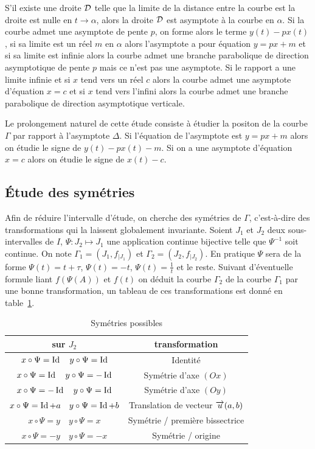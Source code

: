 S'il existe une droite $\mathcal{D}$ telle que la limite de la distance entre la courbe est la droite est nulle en $t \to \alpha$, alors la droite $\mathcal{D}$ est asymptote à la courbe en $\alpha$. Si la courbe admet une asymptote de pente $p$, on forme alors le terme $y(t)-px(t)$, si sa limite est un réel $m$ en $\alpha$ alors l'asymptote a pour équation $y=px+m$ et si sa limite est infinie alors la courbe admet une branche parabolique de direction asymptotique de pente $p$ mais ce n'est pas une asymptote. Si le rapport a une limite infinie et si $x$ tend vers un réel $c$ alors la courbe admet une asymptote d'équation $x=c$ et si $x$ tend vers l'infini alors la courbe admet une branche parabolique de direction asymptotique verticale.

Le prolongement naturel de cette étude consiste à étudier la positon de la courbe $\Gamma$ par rapport à l'asymptote $\Delta$. Si l'équation de l'asymptote est $y=px+m$ alors on étudie le signe de $y(t)-px(t)-m$. Si on a une asymptote d'équation $x=c$ alors on étudie le signe de $x(t)-c$.

\subsection{Étude des symétries}
Afin de réduire l'intervalle d'étude, on cherche des symétries de $\Gamma$, c'est-à-dire des transformations qui la laissent globalement invariante. Soient $J_1$ et $J_2$ deux sous-intervalles de $I$, $\Psi:J_2 \longmapsto J_1$ une application continue bijective telle que $\Psi^{-1}$ soit continue. On note $\Gamma_1=(J_1,f_{|J_1})$ et $\Gamma_2=(J_2,f_{|J_2})$. En pratique $\Psi$ sera de la forme $\Psi(t)=t+\tau$, $\Psi(t)=-t$, $\Psi(t)=\frac{1}{t}$ et le reste. Suivant d'éventuelle formule liant $f(\Psi(A))$ et $f(t)$ on déduit la courbe $\Gamma_2$ de la courbe $\Gamma_1$ par une bonne transformation, un tableau de ces transformations est donné en table~\ref{tab:sym}.

\begin{table}
 \centering
 \begin{tabular}{|c|c|} \hline
  sur $ J_2$ & transformation \\ \hline
  $x \circ \Psi=\operatorname{Id} \quad y \circ \Psi=\operatorname{Id}$ &Identité \\ \hline
  $x \circ \Psi=\operatorname{Id} \quad y \circ \Psi=-\operatorname{Id}$ &Symétrie d'axe $(Ox)$ \\ \hline
  $x \circ \Psi=-\operatorname{Id} \quad y \circ \Psi=\operatorname{Id}$ &Symétrie d'axe $(Oy)$ \\ \hline
  $x \circ \Psi=\operatorname{Id}+a \quad y \circ \Psi=\operatorname{Id}+b$ & Translation de vecteur $\overrightarrow{u}(a,b)$\\ \hline
  $x \circ \Psi=y \quad y \circ \Psi=x$ & Symétrie / première bissectrice\\ \hline
  $x \circ \Psi=-y \quad y \circ \Psi=-x$ & Symétrie / origine\\ \hline
 \end{tabular}
 \caption{Symétries possibles}
 \label{tab:sym}
\end{table}

